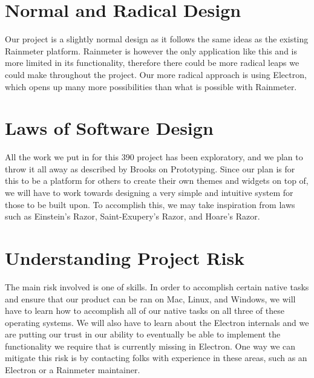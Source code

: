 \documentclass[11pt, oneside]{article}   	%
\begin{document}
\section{Normal and Radical Design}

Our project is a slightly normal design as it follows the same ideas as the
existing Rainmeter platform.  Rainmeter is however the only application like
this and is more limited in its functionality, therefore there could be more
radical leaps we could make throughout the project.  Our more radical approach
is using Electron, which opens up many more possibilities than what is possible
with Rainmeter.

\section{Laws of Software Design}

All the work we put in for this 390 project has been exploratory, and we plan to
throw it all away as described by Brooks on Prototyping.  Since our plan is for
this to be a platform for others to create their own themes and widgets on top
of, we will have to work towards designing a very simple and intuitive system
for those to be built upon.  To accomplish this, we may take inspiration from
laws such as Einstein's Razor, Saint-Exupery's Razor, and Hoare's Razor.

\section{Understanding Project Risk}

The main risk involved is one of skills.  In order to accomplish certain native
tasks and ensure that our product can be ran on Mac, Linux, and Windows, we will
have to learn how to accomplish all of our native tasks on all three of these
operating systems.  We will also have to learn about the Electron internals and
we are putting our trust in our ability to eventually be able to implement the
functionality we require that is currently missing in Electron.  One way we can
mitigate this risk is by contacting folks with experience in these areas, such
as an Electron or a Rainmeter maintainer.
\end{document}
